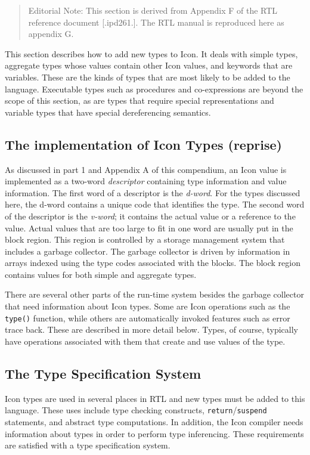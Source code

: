 \begin{quote}
Editorial Note: This section is derived from Appendix F of the RTL
reference document [.ipd261.]. The RTL manual is reproduced here as
appendix G.
\end{quote}

This section describes how to add new types to Icon. It deals with simple
types, aggregate types whose values contain other Icon values, and keywords
that are variables. These are the kinds of types that are most likely to be
added to the language. Executable types such as procedures and
co-expressions are beyond the scope of this section, as are types that
require special representations and variable types that have special
dereferencing semantics.

\subsection{The implementation of Icon Types (reprise)}

As discussed in part 1 and Appendix A of this compendium, an Icon value is
implemented as a two-word \textit{descriptor} containing type information
and value information. The first word of a descriptor is the {\em d-word}.
For the types discussed here, the d-word contains a unique code that
identifies the type. The second word of the descriptor is the {\em v-word};
it contains the actual value or a reference to the value.  Actual values
that are too large to fit in one word are usually put in the block
region. This region is controlled by a storage management system that
includes a garbage collector. The garbage collector is driven by
information in arrays indexed using the type codes associated with the
blocks. The block region contains values for both simple and aggregate
types.

There are several other parts of the run-time system besides the
garbage collector that need information about Icon types. Some are Icon
operations such as the \texttt{type()} function, while others are
automatically invoked features such as error trace back. These are
described in more detail below. Types, of course, typically have operations
associated with them that create and use values of the type.


\subsection{The Type Specification System}

Icon types are used in several places in RTL and new types must be added to
this language. These uses include type checking constructs,
\texttt{return}/\texttt{suspend} statements, and abstract type computations.
In addition, the Icon compiler needs information about types in order to
perform type inferencing. These requirements are satisfied with a type
specification system.

